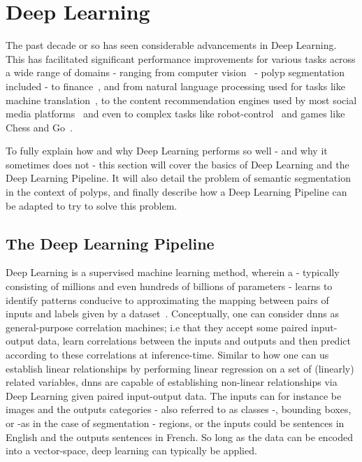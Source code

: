 \section{Deep Learning}
The past decade or so has seen considerable advancements in Deep Learning. This has facilitated significant performance improvements for various tasks across a wide range of domains - ranging from computer vision~\cite{computer_vision} - polyp segmentation included - to finance~\cite{dl_finance}, and from natural language processing used for tasks like machine translation~\cite{dl_nlp}, to the content recommendation engines used by most social media platforms~\cite{dl_recommend} and even to complex tasks like robot-control~\cite{dl_robotics} and games like Chess and Go~\cite{dl_go}. 

To fully explain how and why Deep Learning performs so well - and why it sometimes does not - this section will cover the basics of Deep Learning and the Deep Learning Pipeline. It will also detail the problem of semantic segmentation in the context of polyps, and finally describe how a Deep Learning Pipeline can be adapted to try to solve this problem.

\subsection{The Deep Learning Pipeline}
    Deep Learning is a supervised machine learning method, wherein a  - typically consisting of millions and even hundreds of billions of parameters - learns to identify patterns conducive to approximating the mapping between pairs of inputs and labels given by a dataset~\cite{deep_learning_book}. Conceptually, one can consider \glspl{dnn} as general-purpose correlation machines; i.e that they accept some paired input-output data, learn correlations between the inputs and outputs and then predict according to these correlations at inference-time. Similar to how one can us establish linear relationships by performing linear regression on a set of (linearly) related variables, \glspl{dnn} are capable of establishing non-linear relationships via Deep Learning given paired input-output data. The inputs can for instance be images and the outputs categories - also referred to as classes -, bounding boxes, or -as in the case of segmentation - regions, or the inputs could be sentences in English and the outputs sentences in French. So long as the data can be encoded into a vector-space, deep learning can typically be applied. 
    
